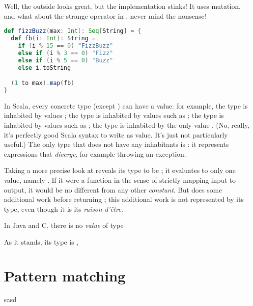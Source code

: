 \documentclass[10 pt]{article}
\begin{document}
Well, the outside looks great, but the implementation stinks! It uses mutation, and what about the strange \pcode{:+} operator in , never mind the  nonsense!

\begin{lstlisting}[caption={Fizz Buzz}, label={code:fb3}, language=Scala, escapechar=|]
def fizzBuzz(max: Int): Seq[String] = {
  def fb(i: Int): String =
    if (i % 15 == 0) "FizzBuzz"
    else if (i % 3 == 0) "Fizz"
    else if (i % 5 == 0) "Buzz"
    else i.toString

  (1 to max).map(fb)
}
\end{lstlisting}




In Scala, every concrete type (except ) can have a value: for example, the type  is inhabited by values ; the type  is inhabited by values such as ; the type  is inhabited by values such as ; the type  is inhabited by the only value \pcode{()}. (No, really, it's perfectly good Scala syntax to write \pcode{()} as value. It's just not particularly useful.) The only type that does not have any inhabitants is : it represents expressions that \emph{diverge}, for example throwing an exception.

Taking a more precise look at  reveals its type to be ; it evaluates to only one value, namely \pcode{()}. If it were a function in the sense of strictly mapping input to output, it would be no different from any other \pcode{()} \emph{constant}. But  does some additional work before returning \pcode{()}; this additional work is not represented by its type, even though it is its \emph{raison d'être}. 

In Java and C, there is no \emph{value} of type 

 As it stands, its type is , 

\newpage

\section{Pattern matching}
sasd
\newpage

\section{}

\printbibliography
\end{document}
